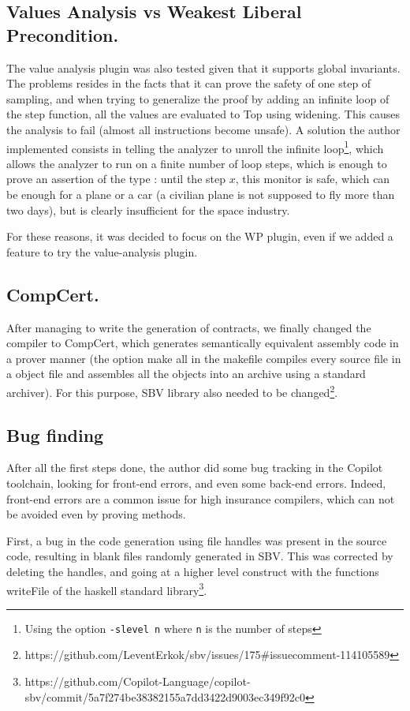 \documentclass[a4paper,11pt,final]{article}
\begin{document}
	\subsection{Values Analysis vs Weakest Liberal Precondition.}
	The value analysis plugin was also tested given that it supports global invariants. The problems resides in the facts that it can prove the safety of one step of sampling, and when trying to generalize the proof by adding an infinite loop of the step function, all the values are evaluated to Top using widening. This causes the analysis to fail (almost all instructions become unsafe). A solution the author implemented consists in telling the analyzer to unroll the infinite loop\footnote{Using the option \texttt{-slevel n} where \texttt{n} is the number of steps}, which allows the analyzer to run on a finite number of loop steps, which is enough to prove an assertion of the type : until the step $x$, this monitor is safe, which can be enough for a plane or a car (a civilian plane is not supposed to fly more than two days), but is clearly insufficient for the space industry.
	
	For these reasons, it was decided to focus on the WP plugin, even if we added a feature to try the value-analysis plugin.
	\subsection{CompCert.}
	
	After managing to write the generation of contracts, we finally changed the compiler to CompCert, which generates semantically equivalent assembly code in a prover manner (the option make all in the makefile compiles every source file in a object file and assembles all the objects into an archive using a standard archiver). For this purpose, SBV library also needed to be changed\footnote{https://github.com/LeventErkok/sbv/issues/175\#issuecomment-114105589}.
	
	\subsection{Bug finding}
	After all the first steps done, the author did some bug tracking in the Copilot toolchain, looking for front-end errors, and even some back-end errors. Indeed, front-end errors are a common issue for high insurance compilers, which can not be avoided even by proving methods\cite{bugC}. 
	
	First, a bug in the code generation using file handles was present in the source code, resulting in blank files randomly generated in SBV. This was corrected by deleting the handles, and going at a higher level construct with the functions writeFile of the haskell standard library\footnote{https://github.com/Copilot-Language/copilot-sbv/commit/5a7f274be38382155a7dd3422d9003ec349f92c0}. 
	
\end{document}
